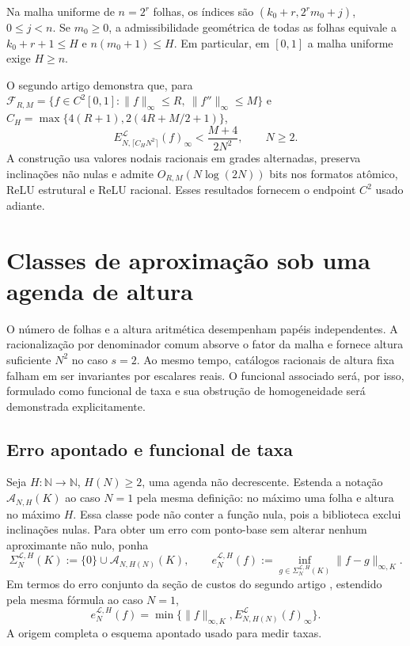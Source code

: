 \documentclass[11pt,a4paper]{article}
\theoremstyle{definition}
\theoremstyle{remark}
\newcommand{\Aclass}{\mathcal{A}}
\newcommand{\Library}{\mathcal{L}}
\begin{document}
Na malha uniforme de $n=2^r$ folhas, os índices são $(k_0+r,2^rm_0+j)$, $0\le j<n$. Se $m_0\ge0$, a admissibilidade geométrica de todas as folhas equivale a $k_0+r+1\le H$ e $n(m_0+1)\le H$. Em particular, em $[0,1]$ a malha uniforme exige $H\ge n$.

O segundo artigo demonstra que, para $\mathcal F_{R,M}=\{f\in C^2[0,1]:\|f\|_\infty\le R,\ \|f''\|_\infty\le M\}$ e $C_H=\max\{4(R+1),2(4R+M/2+1)\}$,
\[
 E_{N,\lceil C_HN^2\rceil}^{\Library}(f)_\infty<\frac{M+4}{2N^2},\qquad N\ge2.
\]
A construção usa valores nodais racionais em grades alternadas, preserva inclinações não nulas e admite $O_{R,M}(N\log(2N))$ bits nos formatos atômico, ReLU estrutural e ReLU racional. Esses resultados fornecem o endpoint $C^2$ usado adiante.

\section{Classes de aproximação sob uma agenda de altura}
\label{sec:approximation-classes}

O número de folhas e a altura aritmética desempenham papéis independentes. A
racionalização por denominador comum absorve o fator da malha e fornece
altura suficiente $N^2$ no caso $s=2$. Ao mesmo tempo, catálogos racionais de
altura fixa falham em ser invariantes por escalares reais. O funcional
associado será, por isso, formulado como funcional de taxa e sua obstrução de
homogeneidade será demonstrada explicitamente.

\subsection{Erro apontado e funcional de taxa}

Seja $H:\mathbb N\to\mathbb N$, $H(N)\ge2$, uma agenda não decrescente.
Estenda a notação $\Aclass_{N,H}(K)$ ao caso $N=1$ pela mesma
definição: no máximo uma folha e altura no máximo $H$. Essa classe pode não
conter a função nula, pois a
biblioteca exclui inclinações nulas. Para obter um erro com ponto-base sem
alterar nenhum aproximante não nulo, ponha
\begin{equation}
 \Sigma_N^{\Library,H}(K)
 :=\{0\}\cup\Aclass_{N,H(N)}(K),
 \qquad
 e_N^{\Library,H}(f)
 :=\inf_{g\in\Sigma_N^{\Library,H}(K)}\|f-g\|_{\infty,K}.
 \label{eq:pointed-error}
\end{equation}
Em termos do erro conjunto da seção de custos do segundo artigo \citep{oliveiraII}, estendido pela mesma fórmula
ao caso $N=1$,
\begin{equation}
 e_N^{\Library,H}(f)
 =\min\bigl\{\|f\|_{\infty,K},
 E_{N,H(N)}^{\Library}(f)_\infty\bigr\}.
 \label{eq:pointed-inherited}
\end{equation}
A origem completa o esquema apontado usado para medir taxas.
\end{document}

